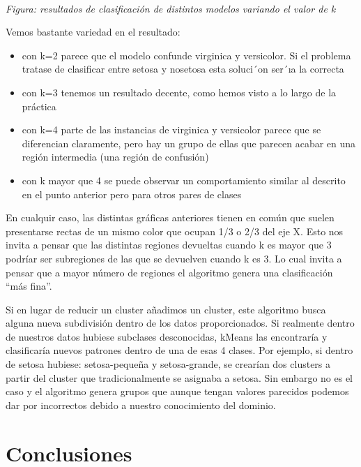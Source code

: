 \documentclass[11pt]{article}
\providecommand{\tightlist}{%
      \setlength{\itemsep}{0pt}\setlength{\parskip}{0pt}}
\begin{document}
    \begin{center}
    \end{center}
    { \hspace*{\fill} \\}
    
    \emph{Figura: resultados de clasificación de distintos modelos variando
el valor de k}

Vemos bastante variedad en el resultado:

\begin{itemize}
\tightlist
\item
  con k=2 parece que el modelo confunde virginica y versicolor. Si el
  problema tratase de clasificar entre setosa y nosetosa esta soluci´on
  ser´ıa la correcta
\item
  con k=3 tenemos un resultado decente, como hemos visto a lo largo de
  la práctica
\item
  con k=4 parte de las instancias de virginica y versicolor parece que
  se diferencian claramente, pero hay un grupo de ellas que parecen
  acabar en una región intermedia (una región de confusión)
\item
  con k mayor que 4 se puede observar un comportamiento similar al
  descrito en el punto anterior pero para otros pares de clases
\end{itemize}

En cualquir caso, las distintas gráficas anteriores tienen en común que
suelen presentarse rectas de un mismo color que ocupan 1/3 o 2/3 del eje
X. Esto nos invita a pensar que las distintas regiones devueltas cuando
k es mayor que 3 podríar ser subregiones de las que se devuelven cuando
k es 3. Lo cual invita a pensar que a mayor número de regiones el
algoritmo genera una clasificación ``más fina''.

Si en lugar de reducir un cluster añadimos un cluster, este algoritmo
busca alguna nueva subdivisión dentro de los datos proporcionados. Si
realmente dentro de nuestros datos hubiese subclases desconocidas,
kMeans las encontraría y clasificaría nuevos patrones dentro de una de
esas 4 clases. Por ejemplo, si dentro de setosa hubiese: setosa-pequeña
y setosa-grande, se crearían dos clusters a partir del cluster que
tradicionalmente se asignaba a setosa. Sin embargo no es el caso y el
algoritmo genera grupos que aunque tengan valores parecidos podemos dar
por incorrectos debido a nuestro conocimiento del dominio.

\section{Conclusiones}\label{conclusiones}
\end{document}
